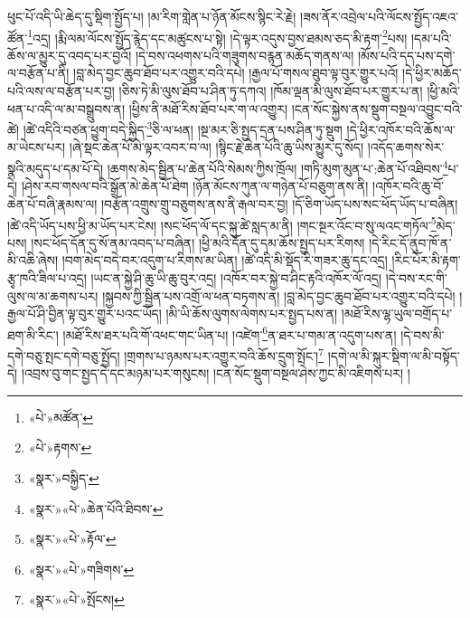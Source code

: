 ཕུང་པོ་འདི་ཡི་ཆེད་དུ་སྡིག་སྤྱོད་པ། །མ་རིག་གླེན་པ་ཉོན་མོངས་སྙིང་རེ་རྗེ། །ཟས་ནོར་འབྲེལ་པའི་ལོངས་སྤྱོད་འཇའ་ཚོན་\footnote{«པེ་»མཚོན་}འདྲ། །རྨི་ལམ་ལོངས་སྤྱོད་རྙེད་དང་མཚུངས་པ་སྟེ། །དེ་ལྟར་འདུས་བྱས་ཐམས་ཅད་མི་རྟག་\footnote{«པེ་»རྟགས་}པས། །དམ་པའི་ཆོས་ལ་མྱུར་དུ་འབད་པར་བྱའོ། །དེ་བས་འཕགས་པའི་གཟུགས་བརྙན་མཆོད་གནས་ལ། །མོས་པའི་དད་པས་དགེ་ལ་བརྩོན་པ་ནི། །བླ་མེད་བྱང་ཆུབ་ཐོབ་པར་འགྱུར་བའི་དཔེ། །རྒྱལ་པོ་གསལ་ཐུབ་ལྟ་བུར་གྱུར་པའོ། །དེ་ཕྱིར་མཆོད་པའི་ལས་ལ་བརྩོན་པར་བྱ། །ཅིས་ཏེ་མི་ལུས་ཐོབ་པ་ཤིན་ཏུ་དཀའ། །ཁོམ་ལྡན་མི་ལུས་ཐོབ་པར་གྱུར་པ་ན། །ཕྱི་མའི་ཕན་པ་འདི་ལ་མ་བསྒྲུབས་ན། །ཕྱིས་ནི་མཐོ་རིས་ཐོབ་པར་ག་ལ་འགྱུར། །ངན་སོང་སྐྱེས་ནས་སྡུག་བསྔལ་འབྱུང་བའི་ཚེ། །ཚེ་འདིའི་བཙན་ཕྱུག་བདེ་སྐྱིད་\footnote{«སྣར་»བསྐྱིད་}ཅི་ལ་ཕན། །སྔ་མར་ཅི་སྤྱད་དྲན་པས་ཤིན་ཏུ་སྡུག །དེ་ཕྱིར་འཁོར་བའི་ཆོས་ལ་མ་ཡེངས་པར། །ཞེ་སྡང་ཆེན་པོ་མེ་ལྟར་འབར་བ་ལ། །སྙིང་རྗེ་ཆེན་པོའི་ཆུ་ཡིས་མྱུར་དུ་སོད། །འདོད་ཆགས་སེར་སྣའི་མདུད་པ་དམ་པོ་དེ། །ཆགས་མེད་སྦྱིན་པ་ཆེན་པོའི་སེམས་ཀྱིས་ཁྲོལ། །གཏི་མུག་མུན་པ་:ཆེན་པོ་འཐིབས་\footnote{«སྣར་»«པེ་»ཆེན་པོའི་ཐིབས་}པ་དེ། །ཤེས་རབ་གསལ་བའི་སྒྲོན་མེ་ཆེན་པོ་ཐེག །ཉོན་མོངས་ཀུན་ལ་གཉེན་པོ་བཅུག་ནས་ནི། །འཁོར་བའི་ཆུ་བོ་ཆེན་པོ་བཞི་རྣམས་ལ། །བརྩོན་འགྲུས་གྲུ་བཅུགས་ནས་ནི་རྒལ་བར་བྱ། །དོ་ཅིག་ཡོད་པས་སང་ཕོད་ཡོད་པ་བཞིན། །ཚེ་འདི་ཡོད་པས་ཕྱི་མ་ཡོད་པར་ངེས། །སང་ཕོད་ལོ་དང་སྐུ་ཚེ་སླད་མ་ནི། །གང་སྔར་འོང་བ་སུ་ལའང་གཏོལ་\footnote{«སྣར་»«པེ་»རྟོལ་}མེད་པས། །སང་ཕོད་དོན་དུ་སོ་ནམ་འབད་པ་བཞིན། །ཕྱི་མའི་དོན་དུ་དམ་ཆོས་སྤྱད་པར་རིགས། །དེ་རིང་དོ་ནུབ་ཁོ་ན་མི་འཆི་ཞེས། །བག་མེད་བདེ་བར་འདུག་པ་རིགས་མ་ཡིན། །ཚེ་འདི་མི་སྡོད་རི་གཟར་ཆུ་དང་འདྲ། །རིང་པོར་མི་རྟག་རྩྭ་ཁའི་ཟིལ་པ་འདྲ། །ཡང་ན་སྐྱེ་ཤི་ཆུ་ཡི་ཆུ་བུར་འདྲ། །འཁོར་བར་སྐྱེ་བ་ཤིང་རྟའི་འཁོར་ལོ་འདྲ། །དེ་བས་རང་གི་ལུས་ལ་མ་ཆགས་པར། །སྐྱབས་ཀྱི་སྦྱིན་པས་འགྲོ་ལ་ཕན་བཏགས་ན། །བླ་མེད་བྱང་ཆུབ་ཐོབ་པར་འགྱུར་བའི་དཔེ། །རྒྱལ་པོ་ཤི་བྱིན་ལྟ་བུར་གྱུར་པའང་ཡོད། །མི་ཡི་ཆོས་ལུགས་ལེགས་པར་སྤྱད་པས་ན། །མཐོ་རིས་ལྷ་ཡུལ་བགྲོད་པ་ཐག་མི་རིང་། །མཐོ་རིས་ཐར་པའི་གོ་འཕང་གང་ཡིན་པ། །འཛེག་\footnote{«སྣར་»«པེ་»གཟིགས་}ན་ཐར་པ་གམ་ན་འདུག་པས་ན། །དེ་བས་མི་དགེ་བཅུ་སྤང་དགེ་བཅུ་སྤྱོད། །གྲགས་པ་ཉམས་པར་འགྱུར་བའི་ཆོས་དྲུག་སྤོང་།\footnote{«སྣར་»«པེ་»སྤོངས།} །དགེ་ལ་མི་སྐུར་སྡིག་ལ་མི་བསྟོད་དེ། །འབྲས་བུ་གང་སྤྱད་དེ་དང་མཉམ་པར་གསུངས། །ངན་སོང་སྡུག་བསྔལ་ཤེས་ཀྱང་མི་འཇིགས་པར། །
